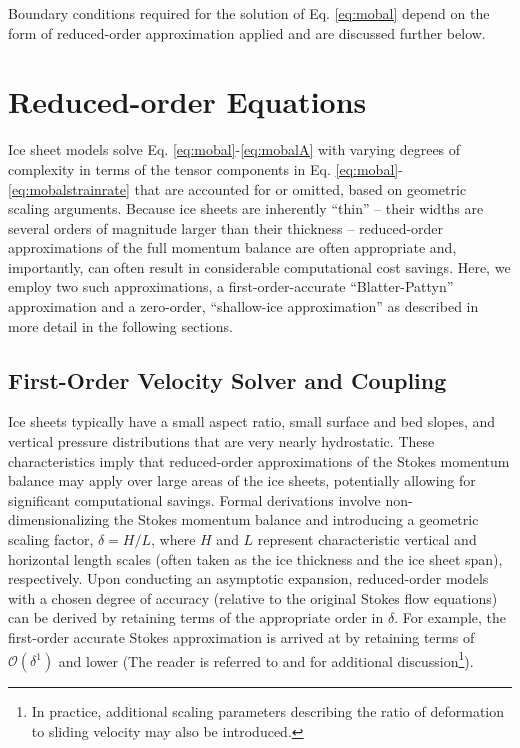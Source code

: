 Boundary conditions required for the solution of Eq. \ref{eq:mobal} depend on the form of reduced-order approximation applied and are discussed further below.

\section{Reduced-order Equations}
\label{sec:consmomred}

Ice sheet models solve Eq. \ref{eq:mobal}-\ref{eq:mobalA} with varying degrees of complexity in terms of the tensor components in Eq. \ref{eq:mobal}-\ref{eq:mobalstrainrate} that are accounted for or omitted, based on geometric scaling arguments. Because ice sheets are inherently ``thin'' -- their widths are several orders of magnitude larger than their thickness -- reduced-order approximations of the full momentum balance are often appropriate \citep[see, e.g.,][]{Dukowicz2010,Schoof2013} and, importantly, can often result in considerable computational cost savings. Here, we employ two such approximations, a first-order-accurate ``Blatter-Pattyn'' approximation and a zero-order, ``shallow-ice approximation'' as described in more detail in the following sections.

\subsection{First-Order Velocity Solver and Coupling}
\label{sec:foMomBal}

Ice sheets typically have a small aspect ratio, small surface and bed slopes, and vertical pressure distributions that are very nearly hydrostatic. These characteristics imply that reduced-order approximations of the Stokes momentum balance may apply over large areas of the ice sheets, potentially allowing for significant computational savings. Formal derivations involve non-dimensionalizing the Stokes momentum balance and introducing a geometric scaling factor, $\delta=H/L$, where $H$ and $L$ represent characteristic vertical and horizontal length scales (often taken as the ice thickness and the ice sheet span), respectively. Upon conducting an asymptotic expansion, reduced-order models with a chosen degree of accuracy (relative to the original Stokes flow equations) can be derived by retaining terms of the appropriate order in $\delta$. For example, the first-order accurate Stokes approximation is arrived at by retaining terms of $\mathcal{O}(\delta^1)$ and lower (The reader is referred to \cite{Schoof2010} and \cite{Dukowicz2010} for additional discussion\footnote{In practice, additional scaling parameters describing the ratio of deformation to sliding velocity may also be introduced.}). 


